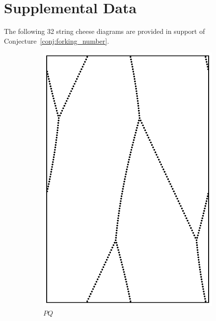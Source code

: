 \documentclass[12pt,twoside]{reedthesis}
\theoremstyle{definition}
\begin{document}
\chapter{Supplemental Data}\label{chap:data}

The following 32 string cheese diagrams are provided in support of Conjecture~\ref{conj:forking_number}. 

\begin{figure}[b!]
  \centering
  \begin{subfigure}[t]{0.24\textwidth}
    \includegraphics[width=\textwidth]{figures/string_cheese_appendix/pq.pdf}
    \caption*{$PQ$}
    \vspace{5mm}
  \end{subfigure}
  \hfill
  \begin{subfigure}[t]{0.24\textwidth}

\end{subfigure}
\end{figure}
\end{document}
